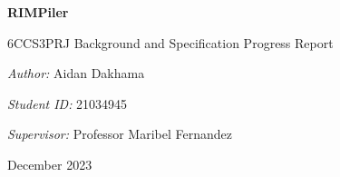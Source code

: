 \begin{titlepage}
    \begin{center}
        \vspace*{1cm}

        \textbf{RIMPiler}

        \vspace{0.5cm}
        6CCS3PRJ Background and Specification Progress Report

        \vspace{8cm}

        \begin{minipage}{0.8\textwidth}
            \begin{center}
                \large \emph{Author:}
                Aidan Dakhama
            \end{center}
        \end{minipage}

        \vspace{0.5cm}

        \begin{minipage}{0.8\textwidth}
            \begin{center}
                \large \emph{Student ID:}
                21034945
            \end{center}
        \end{minipage}

        \vspace{0.5cm}

        \begin{minipage}{0.8\textwidth}
            \begin{center}
                \large \emph{Supervisor:}
                Professor Maribel Fernandez
            \end{center}
        \end{minipage}

        \vspace{2cm}

        \begin{minipage}{0.8\textwidth}
            \begin{center}
                December 2023
            \end{center}
        \end{minipage}

    \end{center}
\end{titlepage}